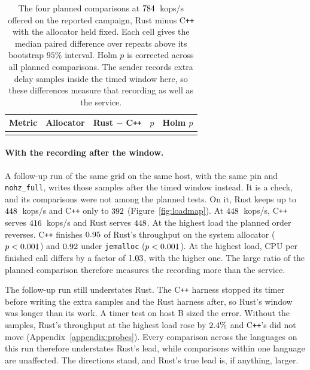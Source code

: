 \documentclass[english,oneside,a4paper,censored,csm,software-track-2020]{HYthesisML}
\begin{document}
\begin{table}[!ht]
\centering
\small
\caption[The four planned comparisons past saturation]{The four planned
comparisons at $784$~kops/s offered on the reported campaign, Rust
minus C\texttt{++} with the allocator held fixed. Each cell gives the median
paired difference over \NRepeats{} repeats above its bootstrap $95\%$ interval.
Holm $p$ is corrected across all
\NTests{} planned comparisons. The sender records extra delay samples inside
the timed window here, so these differences measure that recording as well as
the service.\label{tab:overloadtest}}
\setlength{\tabcolsep}{4pt}
\begin{tabular}{@{}l l r r r@{}}
\hline\hline
Metric & Allocator & Rust $-$ C\texttt{++} & $p$ & Holm $p$ \\
\hline
\\
\hline
\end{tabular}
\end{table}

\paragraph{With the recording after the window.}
A follow-up run of the same grid on the same host, with the same pin and
\texttt{nohz\_full}, writes those samples after the timed window instead. It is a
check, and its comparisons were not among the planned tests. On it, Rust
keeps up to $448$~kops/s and C\texttt{++} only to
$392$ (Figure~\ref{fig:loadmap}). At $448$~kops/s,
C\texttt{++} serves $416$~kops/s and Rust serves
$448$. At the highest load the planned order reverses.
C\texttt{++} finishes $0.95$ of Rust's throughput on the
system allocator ($p <0.001$) and $0.92$
under \texttt{jemalloc} ($p <0.001$). At the highest load, CPU
per finished call differs by a factor of $1.03$,
with \ProbeAfterCpuPerOpHigher{} the higher one. The large ratio of the planned
comparison therefore measures the recording more than the service.

The follow-up run still understates Rust. The C\texttt{++} harness stopped its
timer before writing the extra samples and the Rust harness after, so Rust's
window was longer than its work. A timer test on host B sized the error. Without
the samples, Rust's throughput at the highest load rose by
$2.4\%$ and C\texttt{++}'s did not move
(Appendix~\ref{appendix:probes}). Every comparison across the languages on this
run therefore understates Rust's lead, while comparisons within one language are
unaffected. The directions stand, and Rust's true lead is, if anything, larger.
\end{document}
